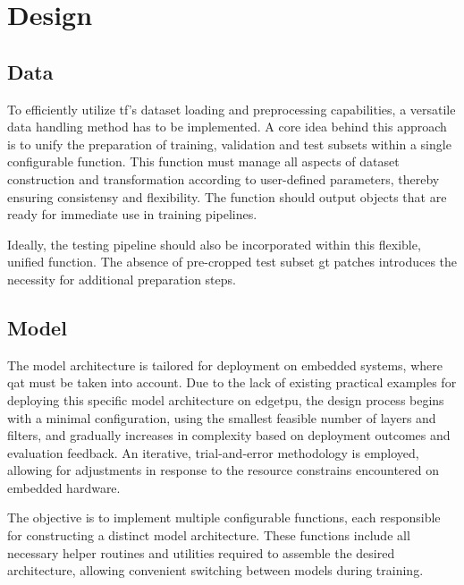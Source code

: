 {\section{Design}

\subsection*{Data}

To efficiently utilize \gls{tf}'s dataset loading and preprocessing capabilities, a versatile data handling method has to be implemented.
A core idea behind this approach is to unify the preparation of training, validation and test subsets within a single configurable function.
This function must manage all aspects of dataset construction and transformation according to user-defined parameters, thereby ensuring consistensy and flexibility.
The function should output  objects \cite{tfDataset} that are ready for immediate use in training pipelines. \cite{tfPaper}

Ideally, the testing pipeline should also be incorporated within this flexible, unified function.
The absence of pre-cropped test subset \gls{gt} patches introduces the necessity for additional preparation steps.

\subsection*{Model}

The model architecture is tailored for deployment on embedded systems, where \gls{qat} must be taken into account.
Due to the lack of existing practical examples for deploying this specific model architecture on \gls{edgetpu},
the design process begins with a minimal configuration, using the smallest feasible number of layers and filters,
and gradually increases in complexity based on deployment outcomes and evaluation feedback.
An iterative, trial-and-error methodology is employed, allowing for adjustments in response to the resource constrains encountered on embedded hardware.

The objective is to implement multiple configurable functions, each responsible for constructing a distinct model architecture.
These functions include all necessary helper routines and utilities required to assemble the desired architecture,
allowing convenient switching between models during training.

}
